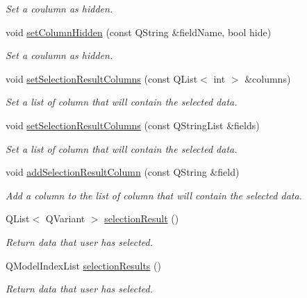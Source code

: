 \begin{DoxyCompactItemize}
\begin{DoxyCompactList}\small\item\em Set a coulumn as hidden. \end{DoxyCompactList}\item 
void \hyperlink{classmdt_sql_selection_dialog_a163280676920829583a4888b742fc96c}{setColumnHidden} (const QString \&fieldName, bool hide)
\begin{DoxyCompactList}\small\item\em Set a coulumn as hidden. \end{DoxyCompactList}\item 
void \hyperlink{classmdt_sql_selection_dialog_a88311778de191bf78e351ea4370b9a6d}{setSelectionResultColumns} (const QList$<$ int $>$ \&columns)
\begin{DoxyCompactList}\small\item\em Set a list of column that will contain the selected data. \end{DoxyCompactList}\item 
void \hyperlink{classmdt_sql_selection_dialog_a5c5c36414bf3c432979f53ad27f985cb}{setSelectionResultColumns} (const QStringList \&fields)
\begin{DoxyCompactList}\small\item\em Set a list of column that will contain the selected data. \end{DoxyCompactList}\item 
void \hyperlink{classmdt_sql_selection_dialog_ae5582bd717078a137dd71d5a1b9cc9f9}{addSelectionResultColumn} (const QString \&field)
\begin{DoxyCompactList}\small\item\em Add a column to the list of column that will contain the selected data. \end{DoxyCompactList}\item 
QList$<$ QVariant $>$ \hyperlink{classmdt_sql_selection_dialog_a23592c799f3b8945b3f5e72082dc265b}{selectionResult} ()
\begin{DoxyCompactList}\small\item\em Return data that user has selected. \end{DoxyCompactList}\item 
QModelIndexList \hyperlink{classmdt_sql_selection_dialog_a85b7c1e3e156c141315d0873fa36d4b3}{selectionResults} ()
\begin{DoxyCompactList}\small\item\em Return data that user has selected. \end{DoxyCompactList}\end{DoxyCompactItemize}


